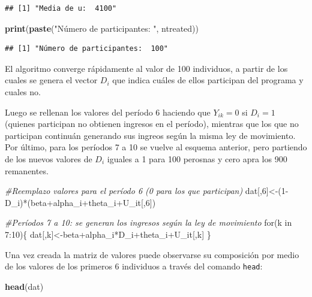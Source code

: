 \documentclass[]{article}
\newenvironment{Shaded}{\begin{snugshade}}{\end{snugshade}}
\newcommand{\KeywordTok}[1]{\textcolor[rgb]{0.13,0.29,0.53}{\textbf{{#1}}}}
\newcommand{\DecValTok}[1]{\textcolor[rgb]{0.00,0.00,0.81}{{#1}}}
\newcommand{\StringTok}[1]{\textcolor[rgb]{0.31,0.60,0.02}{{#1}}}
\newcommand{\CommentTok}[1]{\textcolor[rgb]{0.56,0.35,0.01}{\textit{{#1}}}}
\newcommand{\NormalTok}[1]{{#1}}
\begin{document}
\begin{verbatim}
## [1] "Media de u:  4100"
\end{verbatim}

\begin{Shaded}
\begin{Highlighting}[]
  \KeywordTok{print}\NormalTok{(}\KeywordTok{paste}\NormalTok{(}\StringTok{"Número de participantes: "}\NormalTok{, ntreated))  }
\end{Highlighting}
\end{Shaded}

\begin{verbatim}
## [1] "Número de participantes:  100"
\end{verbatim}

El algoritmo converge rápidamente al valor de 100 individuos, a partir
de los cuales se genera el vector $D_{i}$ que indica cuáles de ellos
participan del programa y cuales no.

Luego se rellenan los valores del período 6 haciendo que $Y_{ik}=0$ si
$D_{i}=1$ (quienes participan no obtienen ingresos en el período),
mientras que los que no participan continuán generando sus ingreos según
la misma ley de movimiento. Por último, para los períodos 7 a 10 se
vuelve al esquema anterior, pero partiendo de los nuevos valores de
$D_{i}$ iguales a 1 para 100 perosnas y cero apra los 900 remanentes.

\begin{Shaded}
\begin{Highlighting}[]
\CommentTok{#Reemplazo valores para el período 6 (0 para los que participan)}
\NormalTok{dat[,}\DecValTok{6}\NormalTok{]<-(}\DecValTok{1}\NormalTok{-D_i)*(beta+alpha_i+theta_i+U_it[,}\DecValTok{6}\NormalTok{])}


\CommentTok{#Períodos 7 a 10: se generan los ingresos según la ley de movimiento}
\NormalTok{for(k in }\DecValTok{7}\NormalTok{:}\DecValTok{10}\NormalTok{)\{}
  \NormalTok{dat[,k]<-beta+alpha_i*D_i+theta_i+U_it[,k]}
\NormalTok{\}}
\end{Highlighting}
\end{Shaded}

Una vez creada la matriz de valores puede observarse su composición por
medio de los valores de los primeros 6 individuos a través del comando
\texttt{head}:

\begin{Shaded}
\begin{Highlighting}[]
\KeywordTok{head}\NormalTok{(dat)}
\end{Highlighting}
\end{Shaded}
\end{document}
